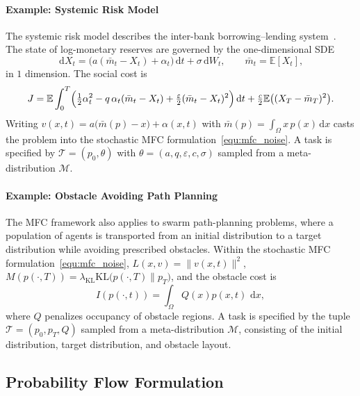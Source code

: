 \documentclass[preprint]{elsarticle}
\newcommand{\dd}{\,\mathrm{d}}          %
\newcommand{\qb}[1]{\bigl(#1\bigr)}          %
\newcommand{\qB}[1]{\Bigl(#1\Bigr)}          %
\newcommand{\E}{\mathbb{E}}
\renewcommand{\l}{\lambda}
\begin{document}
\paragraph{Example: Systemic Risk Model}
The systemic risk model describes the inter-bank borrowing--lending system~\cite{carmona2015systemic}. The state of log-monetary reserves are governed by the one-dimensional SDE
\begin{equation}\label{eq:Sysrisk_state}
\dd X_t = \qb{a(\bar m_t-X_t)+\alpha_t}\dd t+\sigma\dd W_t,
\qquad
\bar m_t=\E[X_t],
\end{equation}
in $1$ dimension. The social cost is
\begin{equation}\label{eq:Sysrisk_cost}
J=\E\int_0^T\qB{\tfrac12\alpha_t^2-q\,\alpha_t(\bar m_t-X_t)
+\tfrac{\varepsilon}{2}(\bar m_t-X_t)^2}\dd t
+\tfrac{c}{2}\E\qb{(X_T-\bar m_T)^2}.
\end{equation}
Writing $v(x,t)=a\qb{\bar m(p)-x}+\alpha(x,t)$ with $\bar m(p)=\int_\Omega x\,p(x)\dd x$ casts the problem into the stochastic MFC formulation~\eqref{equ:mfc_noise}. A task is specified by $\mathcal T=(p_0,\theta)$ with $\theta=(a,q,\varepsilon,c,\sigma)$ sampled from a meta-distribution $\mathcal M$.

\paragraph{Example: Obstacle Avoiding Path Planning}
The MFC framework also applies to swarm path-planning problems, where a population of agents is transported from an initial distribution to a target distribution while avoiding prescribed obstacles. Within the stochastic MFC formulation~\eqref{equ:mfc_noise}, $L(x,v) = \|v(x,t)\|^2$, $M(p(\cdot,T)) = \l_{\mathrm{KL}}\mathrm{KL}\qb{p(\cdot,T) \| p_T}$, and the obstacle cost is
\[
I(p(\cdot,t)) = \int_\Omega Q(x)p(x,t)\,\dd x,
\]
where $Q$ penalizes occupancy of obstacle regions. A task is specified by the tuple $\mathcal T=(p_0,p_T,Q)$ sampled from a meta-distribution $\mathcal M$, consisting of the initial distribution, target distribution, and obstacle layout.


\subsection{Probability Flow Formulation}\label{sec:change_of_variable}
\end{document}
